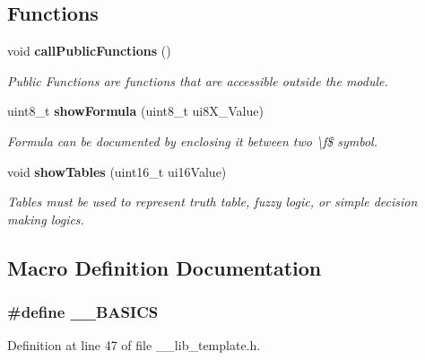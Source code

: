 \subsection*{Functions}
\begin{DoxyCompactItemize}
\item 
void {\bf call\-Public\-Functions} ()
\begin{DoxyCompactList}\small\item\em Public Functions are functions that are accessible outside the module. \end{DoxyCompactList}\item 
uint8\-\_\-t {\bf show\-Formula} (uint8\-\_\-t ui8\-X\-\_\-\-Value)
\begin{DoxyCompactList}\small\item\em Formula can be documented by enclosing it between two \textbackslash{}f\$ symbol. \end{DoxyCompactList}\item 
void {\bf show\-Tables} (uint16\-\_\-t ui16\-Value)
\begin{DoxyCompactList}\small\item\em Tables must be used to represent truth table, fuzzy logic, or simple decision making logics. \end{DoxyCompactList}\end{DoxyCompactItemize}


\subsection{Macro Definition Documentation}
\subsubsection[{\-\_\-\-\_\-\-B\-A\-S\-I\-C\-S}]{\setlength{\rightskip}{0pt plus 5cm}\#define \-\_\-\-\_\-\-B\-A\-S\-I\-C\-S}\label{____lib__template_8h_a7864a852d9905ab5240b86ec05b7dafb}


Definition at line 47 of file \-\_\-\-\_\-lib\-\_\-template.\-h.

